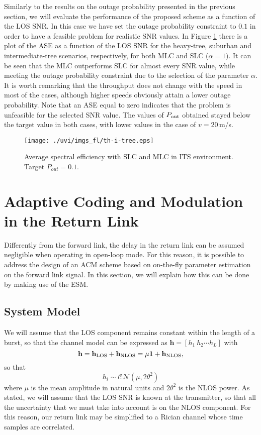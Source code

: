 \documentclass[journal,onecolumn,10pt,a4paper]{IEEEtran}
\def\1{{\mathbf 1}}
\def\h{{\mathbf h}}
\begin{document}
Similarly to the results on the outage probability presented in the previous section, we will evaluate the performance of the proposed scheme as a function of the LOS SNR. In this case we have set the outage probability constraint to $0.1$ in order to have a feasible problem for realistic SNR values. In Figure \ref{f:th-i-tree} there is a plot of the ASE as a function of the LOS SNR for the heavy-tree, suburban and intermediate-tree scenarios, respectively, for both MLC and SLC ($\alpha = 1)$. It can be seen that the MLC outperforms SLC for almost every SNR value, while meeting the outage probability constraint due to the selection of the parameter $\alpha$. It is worth remarking that the throughput does not change with the speed in most of the cases, although higher speeds obviously attain a lower outage probability. Note that an ASE equal to zero indicates that the problem is unfeasible for the selected SNR value. The values of $P_{\textnormal{out}}$ obtained stayed below the target value in both cases, with lower values in the case of $v = 20$\,m/s.

\begin{figure}
\begin{center}
 \texttt{[image: ./uvi/imgs\_fl/th-i-tree.eps]}
\caption{Average spectral efficiency with SLC and MLC in ITS environment. Target $P_{out} = 0.1$.}
\label{f:th-i-tree}\end{center}
\end{figure}

 \section{Adaptive Coding and Modulation in the Return Link}
\label{sec:rl}
Differently from the forward link, the delay in the return link can be assumed negligible when operating in open-loop mode. For this reason, it is possible to address the design of an ACM scheme based on on-the-fly parameter estimation on the forward link signal. In this section, we will explain how this can be done by making use of the ESM.

\subsection{System Model}
\label{sec:sys_model_rl}
We will assume that the LOS component remains constant within the length of a burst, so that the channel model can be expressed as $\h = \left[h_1 \ h_2 \cdots h_L\right]$ with
\begin{equation}
 \h = \h_{\textnormal{LOS}}+\h_{\textnormal{NLOS}} = \mu\1+\h_{\textnormal{NLOS}},
\end{equation}
so that
\begin{equation}
 h_i\sim\mathcal{C}\mathcal{N}(\mu,2\theta^2)
\end{equation}
where $\mu$ is the mean amplitude in natural units and $2\theta^2$ is the NLOS power. As stated, we will assume that the LOS SNR is known at the transmitter, so that all the uncertainty that we must take into account is on the NLOS component. For this reason, our return link may be simplified to a Rician channel whose time samples are correlated.
\end{document}
